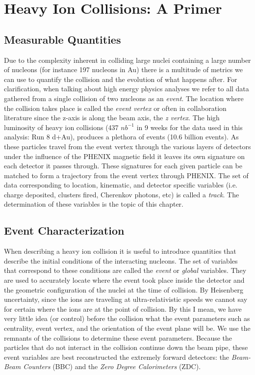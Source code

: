 \chapter{Heavy Ion Collisions: A Primer} %
\label{hicollisions}
\section{Measurable Quantities}
Due to the complexity inherent in colliding large nuclei containing a large number of nucleons (for instance 197 nucleons in Au) there is a multitude of metrics we can use to quantify the collision and the evolution of what happens after. For clarification, when talking about high energy physics analyses we refer to all data gathered from a single collision of two nucleons as an \textit{event}. The location where the collision takes place is called the \textit{event vertex} or often in collaboration literature since the z-axis is along the beam axis, the \textit{z vertex}. The high luminosity of heavy ion collisions (437 $nb^{-1}$ in 9 weeks for the data used in this analysis: Run 8 d+Au), produces a plethora of events (10.6 billion events). As these particles travel from the event vertex through the various layers of detectors under the influence of the PHENIX magnetic field it leaves its own signature on each detector it passes through. These signatures for each given particle can be matched to form a trajectory from the event vertex through PHENIX. The set of data corresponding to location, kinematic, and detector specific variables (i.e. charge deposited, clusters fired, Cherenkov photons, etc) is called a \textit{track}. The determination of these variables is the topic of this chapter.

\section{Event Characterization}
When describing a heavy ion collision it is useful to introduce quantities that describe the initial conditions of the interacting nucleons. The set of variables that correspond to these conditions are called the \textit{event} or \textit{global} variables. They are used to accurately locate where the event took place inside the detector and the geometric configuration of the nuclei at the time of collision. By Heisenberg uncertainty, since the ions are traveling at ultra-relativistic speeds we cannot say for certain where the ions are at the point of collision. By this I mean, we have very little idea (or control) before the collision what the event parameters such as centrality, event vertex, and the orientation of the event plane will be. We use the remnants of the collisions to determine these event parameters. Because the particles that do not interact in the collision continue down the beam pipe, these event variables are best reconstructed the extremely forward detectors: the \textit{Beam-Beam Counters} (BBC) and the \textit{Zero Degree Calorimeters} (ZDC). 

